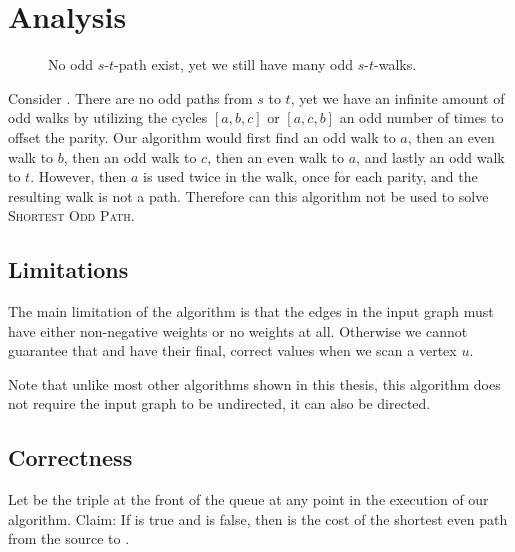 \section{Analysis}

\begin{figure}
    \centering
    \caption{No odd $s$-$t$-path exist, yet we still have many odd $s$-$t$-walks.}
    \label{figure:small2}
 \end{figure}

Consider . There are no odd paths from $s$ to $t$, yet we have an infinite amount of odd walks by utilizing the cycles $[a,b,c]$ or $[a,c,b]$ an odd number of times to offset the parity. Our algorithm would first find an odd walk to $a$, then an even walk to $b$, then an odd walk to $c$, then an even walk to $a$, and lastly an odd walk to $t$. However, then $a$ is used twice in the walk, once for each parity, and the resulting walk is not a path. Therefore can this algorithm not be used to solve \textsc{Shortest Odd Path}.

\subsection{Limitations}
The main limitation of the algorithm is that the edges in the input graph must have either non-negative weights or no weights at all. Otherwise we cannot guarantee that  and  have their final, correct values when we scan a vertex $u$. 

Note that unlike most other algorithms shown in this thesis, this algorithm does not require the input graph to be undirected, it can also be directed.

\subsection{Correctness}
Let  be the triple at the front of the queue at any point in the execution of our algorithm.
Claim: If  is true and  is false, then  is the cost of the shortest even path from the source to .

